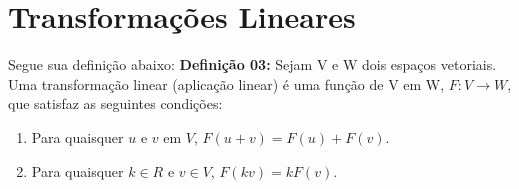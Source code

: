 \chapter{Transformações Lineares}
Segue sua definição abaixo:
\noindent\textbf{Definição 03:} Sejam V e W dois espaços vetoriais. Uma transformação linear (aplicação linear) é uma função de V em W, $F:V \rightarrow W$, que satisfaz as seguintes condições:
\begin{enumerate}
	\item Para quaisquer $u$ e $v$ em $V$, $F(u + v) = F(u) + F(v)$.
	\item Para quaisquer $k \in R$ e $v \in V$, $F(kv) = kF(v)$.
\end{enumerate}	